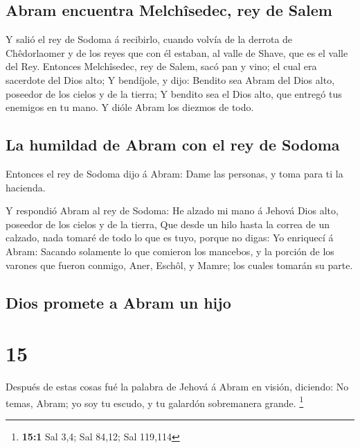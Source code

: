 \hypertarget{abram-encuentra-melchuxeesedec-rey-de-salem}{%
\subsection{Abram encuentra Melchîsedec, rey de
Salem}\label{abram-encuentra-melchuxeesedec-rey-de-salem}}

 Y salió el rey de Sodoma á recibirlo, cuando volvía de
la derrota de Chêdorlaomer y de los reyes que con él estaban, al valle
de Shave, que es el valle del Rey.  Entonces Melchîsedec,
rey de Salem, sacó pan y vino; el cual era sacerdote del Dios alto;
 Y bendíjole, y dijo: Bendito sea Abram del Dios alto,
poseedor de los cielos y de la tierra;  Y bendito sea el
Dios alto, que entregó tus enemigos en tu mano. Y dióle Abram los
diezmos de todo.

\hypertarget{la-humildad-de-abram-con-el-rey-de-sodoma}{%
\subsection{La humildad de Abram con el rey de
Sodoma}\label{la-humildad-de-abram-con-el-rey-de-sodoma}}

 Entonces el rey de Sodoma dijo á Abram: Dame las
personas, y toma para ti la hacienda.

 Y respondió Abram al rey de Sodoma: He alzado mi mano á
Jehová Dios alto, poseedor de los cielos y de la tierra, 
Que desde un hilo hasta la correa de un calzado, nada tomaré de todo lo
que es tuyo, porque no digas: Yo enriquecí á Abram: 
Sacando solamente lo que comieron los mancebos, y la porción de los
varones que fueron conmigo, Aner, Eschôl, y Mamre; los cuales tomarán su
parte.

\hypertarget{dios-promete-a-abram-un-hijo}{%
\subsection{Dios promete a Abram un
hijo}\label{dios-promete-a-abram-un-hijo}}

\hypertarget{section-14}{%
\section{15}\label{section-14}}

 Después de estas cosas fué la palabra de Jehová á Abram
en visión, diciendo: No temas, Abram; yo soy tu escudo, y tu galardón
sobremanera grande. \footnote{\textbf{15:1} Sal 3,4; Sal 84,12; Sal
  119,114}


